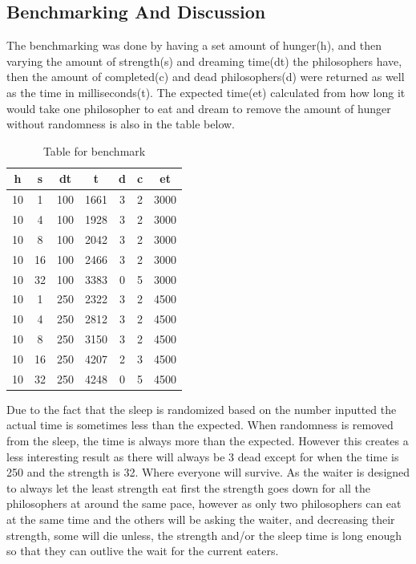 \documentclass[a4paper,11pt]{article}
\begin{document}
\subsection*{Benchmarking And Discussion}
The benchmarking was done by having a set amount of hunger(h), and then varying the amount of strength(s) and dreaming time(dt) the philosophers have, then the amount of completed(c) and dead philosophers(d) were returned as well as the time in milliseconds(t). 
The expected time(et) calculated from how long it would take one philosopher to eat and dream to remove the amount of hunger without randomness is also in the table below. 
\begin{table}[h]
  \begin{center}
  \begin{tabular}{c|c|c|c|c|c|c}
  \textbf{h} &\textbf{s} & \textbf{dt} &\textbf{t} & \textbf{d}& \textbf{c} & \textbf{et}\\
  \hline
  10   & 1  &  100 &  1661 &  3 &  2 &3000 \\
  10   & 4  &  100 &  1928 &  3 &  2 &3000 \\
  10   & 8  &  100 &  2042 &  3 &  2 &3000 \\
  10   & 16 &  100 &  2466 &  3 &  2 &3000 \\
  10   & 32 &  100 &  3383 &  0 &  5 &3000 \\
  10   & 1  &  250 &  2322 &  3 &  2 &4500\\
  10   & 4  &  250 &  2812 &  3 &  2 &4500\\
  10   & 8  &  250 &  3150 &  3 &  2 &4500\\
  10   & 16 &  250 &  4207 &  2 &  3 &4500\\
  10   & 32 &  250 &  4248 &  0 &  5 &4500\\
  \end{tabular}
  \caption{Table for benchmark}
  \label{tab:table1}
  \end{center}
  \end{table}
  \FloatBarrier{\noindent}
Due to the fact that the sleep is randomized based on the number inputted the actual time is sometimes less than the expected. When randomness is removed from the sleep, 
the time is always more than the expected. However this creates a less interesting result as there will always be 3 dead except for when the time is 250 and the strength is 32. Where everyone will survive. 
As the waiter is designed to always let the least strength eat first the strength goes down for all the philosophers at around the same pace, however as only two philosophers can eat at the same time and the others will be asking the waiter, and decreasing their strength, some will die unless, the strength and/or the sleep time is long enough so that they can outlive the wait for the current eaters. 
\end{document}
